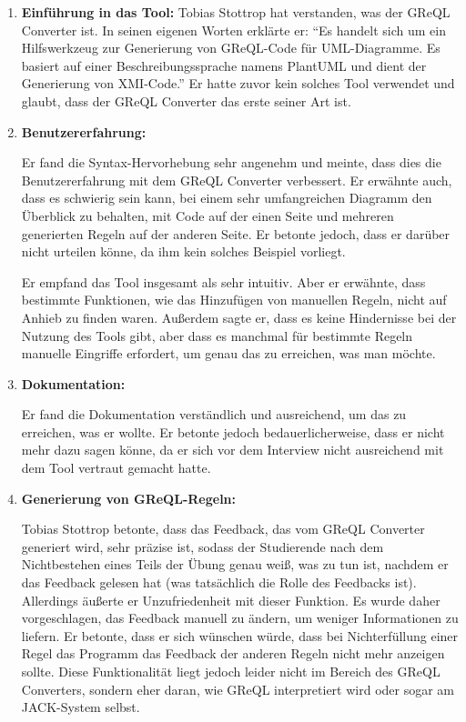 \begin{enumerate}[itemsep=8pt, parsep=5pt]
    \item \textbf{Einführung in das Tool:}
    Tobias Stottrop hat verstanden, was der GReQL Converter ist. In seinen eigenen Worten erklärte er:
    ``Es handelt sich um ein Hilfswerkzeug zur Generierung von GReQL-Code für UML-Diagramme. Es basiert auf einer
    Beschreibungssprache namens PlantUML und dient der Generierung von XMI-Code.'' Er hatte zuvor kein solches Tool
    verwendet und glaubt, dass der GReQL Converter das erste seiner Art ist.

    \item \textbf{Benutzererfahrung:}

    Er fand die Syntax-Hervorhebung sehr angenehm und meinte, dass dies die Benutzererfahrung mit dem GReQL Converter
    verbessert. Er erwähnte auch, dass es schwierig sein kann, bei einem sehr umfangreichen Diagramm den Überblick
    zu behalten, mit Code auf der einen Seite und mehreren generierten Regeln auf der anderen Seite. Er betonte jedoch,
    dass er darüber nicht urteilen könne, da ihm kein solches Beispiel vorliegt.

    Er empfand das Tool insgesamt als sehr intuitiv. Aber er erwähnte, dass bestimmte Funktionen, wie das Hinzufügen von
    manuellen Regeln, nicht auf Anhieb zu finden waren. Außerdem sagte er, dass es keine Hindernisse bei der Nutzung des
    Tools gibt, aber dass es manchmal für bestimmte Regeln manuelle Eingriffe erfordert, um genau das zu erreichen, was
    man möchte.

    \item \textbf{Dokumentation:}

    Er fand die Dokumentation verständlich und ausreichend, um das zu erreichen, was er wollte. Er betonte jedoch
    bedauerlicherweise, dass er nicht mehr dazu sagen könne, da er sich vor dem Interview nicht ausreichend mit dem
    Tool vertraut gemacht hatte.


    \item \textbf{Generierung von GReQL-Regeln:}

    Tobias Stottrop betonte, dass das Feedback, das vom GReQL Converter generiert wird, sehr präzise ist, sodass der
    Studierende nach dem Nichtbestehen eines Teils der Übung genau weiß, was zu tun ist, nachdem er das Feedback gelesen
    hat (was tatsächlich die Rolle des Feedbacks ist). Allerdings äußerte er Unzufriedenheit mit dieser Funktion. Es
    wurde daher vorgeschlagen, das Feedback manuell zu ändern, um weniger Informationen zu liefern. Er betonte, dass er
    sich wünschen würde, dass bei Nichterfüllung einer Regel das Programm das Feedback der anderen Regeln nicht mehr
    anzeigen sollte. Diese Funktionalität liegt jedoch leider nicht im Bereich des GReQL Converters, sondern eher daran,
    wie GReQL interpretiert wird oder sogar am JACK-System selbst.


\end{enumerate}
